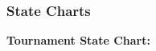 \subsubsection{State Charts}
\textbf{Tournament State Chart:}
\begin{figure}[h]
    \centering
\end{figure}